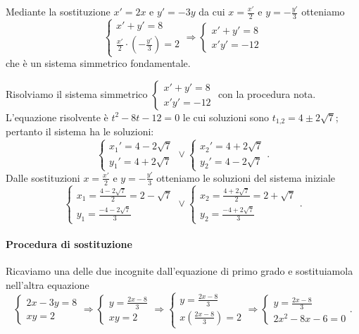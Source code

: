 \begin{exrig}
\begin{esempio}
Mediante la sostituzione $x'=2x$ e $y'=-3y$ da cui $x=\frac{x'} 2$ e $y=-\frac{y'} 3$ otteniamo 
\[\left\{\begin{array}{l}{x'+y'=8}\\
{\frac{x'} 2\cdot \left(-\frac{y'} 3\right)=2}\end{array}\right.
\Rightarrow\left\{\begin{array}{l}{x'+y'=8}\\
{x'y'=-12}\end{array}\right.\] che è un sistema simmetrico fondamentale.

Risolviamo il sistema simmetrico $\left\{\begin{array}{l}{x'+y'=8}\\{x'y'=-12}\end{array}\right.$ con la procedura nota. L'equazione risolvente è $t^2-8t-12=0$ le cui soluzioni sono $t_{1\text{,}2}=4\pm 2\sqrt 7$; pertanto il sistema ha le soluzioni: 
\[\left\{\begin{array}{l}{x_1'=4-2\sqrt 7}\\
{y_1'=4+2\sqrt 7}\end{array}\right.\vee 
\left\{\begin{array}{l}{x_2'=4+2\sqrt 7}\\
{y_2'=4-2\sqrt 7}\end{array}\right..\] 
Dalle sostituzioni $x=\frac{x'} 2$ e $y=-\frac{y'} 3$ otteniamo le soluzioni del sistema iniziale 
\[\left\{\begin{array}{l}{x_1=\frac{4-2\sqrt 7} 2=2-\sqrt 7}\\
{y_1=\frac{-4-2\sqrt 7} 3}\end{array}\right.\vee 
\left\{\begin{array}{l}{x_2=\frac{4+2\sqrt 7} 2=2+\sqrt 7}\\
{y_2=\frac{-4+2\sqrt 7} 3}\end{array}\right..\]
\paragraph{Procedura di sostituzione}
Ricaviamo una delle due incognite dall'equazione di primo grado e sostituiamola nell'altra equazione \[ \left\{\begin{array}{l}{2x-3y=8} \\{{xy}=2}\end{array}\right.\Rightarrow\left\{\begin{array}{l}{y=\frac{2x-8} 3}\\{{xy}=2}\end{array}\right.\Rightarrow \left\{\begin{array}{l}{y=\frac{2x-8} 3}\\{x\left(\frac{2x-8} 3\right)=2}\end{array}\right.\Rightarrow \left\{\begin{array}{l}{y=\frac{2x-8} 3}\\{2x^2-8x-6=0}\end{array}\right.. \]


\end{esempio}
\end{exrig}
